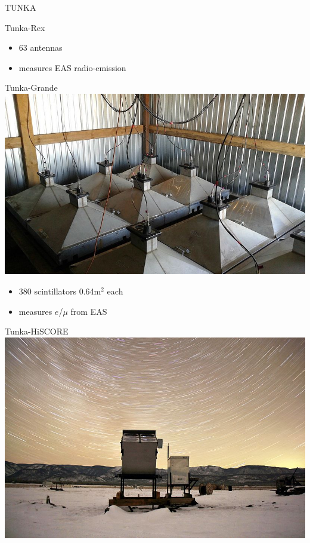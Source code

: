 \begin{frame}{TUNKA}
\begin{minipage}[t]{0.48\textwidth}
\begin{block}{Tunka-Rex}
    \begin{itemize}
      \setlength{\itemsep}{0pt}
      \item 63 antennas
      \item measures EAS radio-emission
    \end{itemize}
  \end{block}
\end{minipage}

\vspace{-1ex}
\begin{minipage}[t]{0.48\textwidth}
  \begin{block}{Tunka-Grande}
    \centering
    \includegraphics[height=0.23\textheight]{pics/Hiller_Roman-005.jpg}\vspace{-2ex}

    \begin{itemize}
      \setlength{\itemsep}{0pt}
      \item 380 scintillators 0.64m$^2$ each
      \item measures $e$/$\mu$ from EAS
    \end{itemize}
  \end{block}
\end{minipage}
\hfill
\begin{minipage}[t]{0.48\textwidth}
  \begin{block}{Tunka-HiSCORE}
    \centering
    \includegraphics[height=0.23\textheight]{pics/Tunka-HiSCORE.jpg}\vspace{-2ex}


\end{block}
\end{minipage}
\end{frame}
